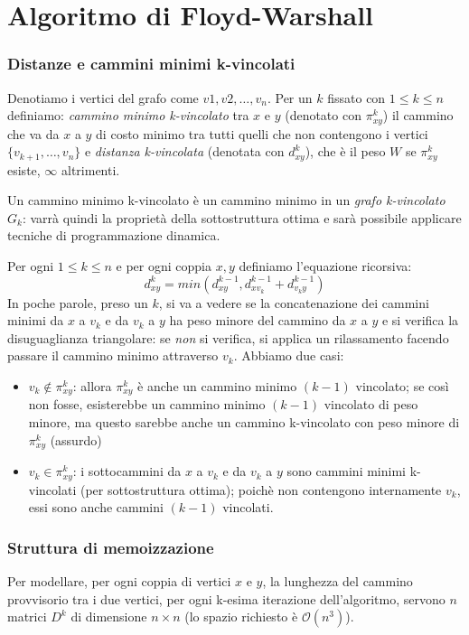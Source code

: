 \documentclass[11pt]{book}
\begin{document}
\section{Algoritmo di Floyd-Warshall}
\subsubsection{Distanze e cammini minimi k-vincolati}
Denotiamo i vertici del grafo come $v1,v2,\dots,v_n$. Per un $k$ fissato con $1\leq k\leq n$ definiamo: \textit{cammino 
minimo k-vincolato} tra $x$ e $y$ (denotato con $\pi^k_{xy}$) il cammino che va da $x$ a $y$ di costo minimo tra tutti
quelli che non contengono i vertici $\{v_{k+1},\dots,v_n\}$ e \textit{distanza k-vincolata} (denotata con $d^k_{xy}$), 
che è il peso $W$ se $\pi^k_{xy}$ esiste, $\infty$ altrimenti.

Un cammino minimo k-vincolato è un cammino minimo in un \textit{grafo k-vincolato} $G_k$: varrà quindi la proprietà della 
sottostruttura ottima e sarà possibile applicare tecniche di programmazione dinamica. 


Per ogni $1\leq k\leq n$ e per ogni coppia $x,y$ definiamo l'equazione ricorsiva: 
\begin{equation*}
    d^k_{xy}=min(d^{k-1}_{xy}, d^{k-1}_{xv_k}+d^{k-1}_{v_ky})
\end{equation*}
In poche parole, preso un $k$, si va a vedere se la concatenazione dei cammini minimi da $x$ a $v_k$ e da $v_k$ a $y$ ha 
peso minore del cammino da $x$ a $y$ e si verifica la disuguaglianza triangolare: se \textit{non} si verifica, si applica 
un rilassamento facendo passare il cammino minimo attraverso $v_k$.
Abbiamo due casi:
\begin{itemize}
    \item $v_k\notin\pi^k_{xy}$: allora $\pi^k_{xy}$ è anche un cammino minimo $(k-1)$ vincolato; se così non fosse, esisterebbe un 
    cammino minimo $(k-1)$ vincolato di peso minore, ma questo sarebbe anche un cammino k-vincolato con peso minore di $\pi^k_{xy}$
    (assurdo)
    \item $v_k\in\pi^k_{xy}$: i sottocammini da $x$ a $v_k$ e da $v_k$ a $y$ sono cammini minimi k-vincolati (per sottostruttura 
    ottima); poichè non contengono internamente $v_k$, essi sono anche cammini $(k-1)$ vincolati.
\end{itemize}
\subsubsection{Struttura di memoizzazione}
Per modellare, per ogni coppia di vertici $x$ e $y$, la lunghezza del cammino provvisorio tra i due vertici, per ogni 
k-esima iterazione dell'algoritmo, servono $n$ matrici $D^k$ di dimensione $n\times n$ (lo spazio richiesto è $\mathcal{O}(n^3)$). 
\end{document}
